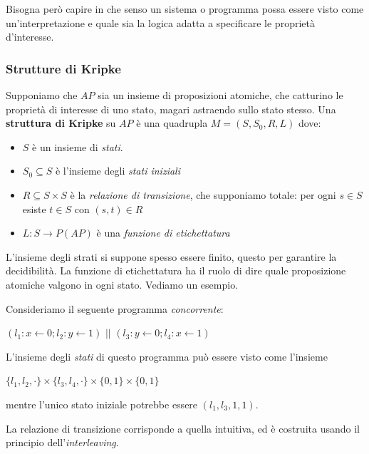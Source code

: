 \documentclass{article}
\begin{document}
Bisogna però capire in che senso un sistema o programma possa essere visto come un'interpretazione e quale sia la logica adatta a specificare le proprietà d'interesse.

\subsubsection{Strutture di Kripke}
Supponiamo che $AP$ sia un insieme di proposizioni atomiche, che catturino le proprietà di interesse di uno stato, magari astraendo sullo stato stesso. Una \textbf{struttura di Kripke} su $AP$ è una quadrupla $M=(S,S_0,R,L)$ dove:
\begin{itemize}
    \item $S$ è un insieme di \textit{stati}.
    \item $S_0\subseteq S$ è l'insieme degli \textit{stati iniziali}
    \item $R\subseteq S\times S$ è la \textit{relazione di transizione}, che supponiamo totale: per ogni $s\in S$ esiste $t\in S$ con $(s,t)\in R$
    \item $L:S\to P(AP)$ è una \textit{funzione di etichettatura}
\end{itemize}

\bigskip

L'insieme degli strati si suppone spesso essere finito, questo per garantire la decidibilità. La funzione di etichettatura ha il ruolo di dire quale proposizione atomiche valgono in ogni stato. Vediamo un esempio.

\bigskip

Consideriamo il seguente programma \textit{concorrente}:

\bigskip

$(l_1:x\leftarrow0;l_2:y\leftarrow1)\,\,||\,\,(l_3:y\leftarrow0;l_4:x\leftarrow1)$

\bigskip

L'insieme degli \textit{stati} di questo programma può essere visto come l'insieme

\bigskip

$\{l_1,l_2,\cdot\}\times\{l_3,l_4,\cdot\}\times\{0,1\}\times\{0,1\}$

mentre l'unico stato iniziale potrebbe essere $(l_1,l_3,1,1)$.

\bigskip

La relazione di transizione corrisponde a quella intuitiva, ed è costruita usando il principio dell'\textit{interleaving}.
\end{document}
